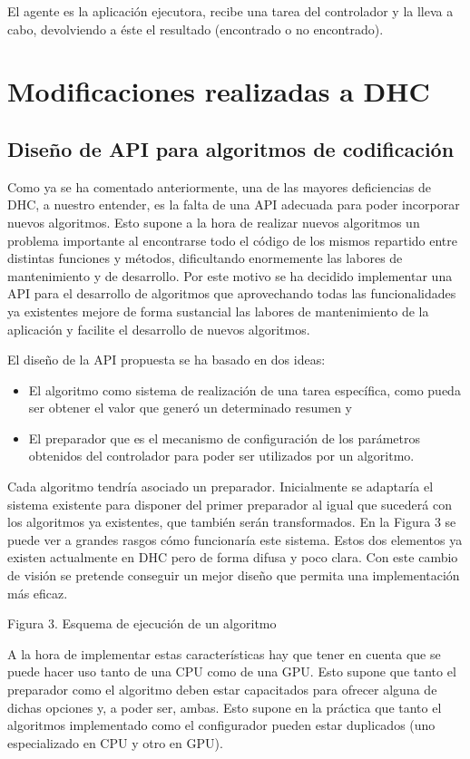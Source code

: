 El agente es la aplicación ejecutora, recibe una tarea del controlador y la lleva a cabo, devolviendo a éste el resultado (encontrado o no encontrado).

\section{Modificaciones realizadas a DHC}

\subsection{Diseño de API para algoritmos de codificación}

Como ya se ha comentado anteriormente, una de las mayores deficiencias de DHC, a nuestro entender, es la falta de una API adecuada para poder incorporar nuevos algoritmos. Esto supone a la hora de realizar nuevos algoritmos un problema importante al encontrarse todo el código de los mismos repartido entre distintas funciones y métodos, dificultando enormemente las labores de mantenimiento y de desarrollo. Por este motivo se ha decidido implementar una API para el desarrollo de algoritmos que aprovechando todas las funcionalidades ya existentes mejore de forma sustancial las labores de mantenimiento de la aplicación y facilite el desarrollo de nuevos algoritmos.

El diseño de la API propuesta se ha basado en dos ideas:
\begin{itemize}
	\item El algoritmo como sistema de realización de una tarea específica, como pueda ser obtener el valor que generó un determinado resumen y
	\item El preparador que es el mecanismo de configuración de los parámetros obtenidos del controlador para poder ser utilizados por un algoritmo.
\end{itemize}

Cada algoritmo tendría asociado un preparador. Inicialmente se adaptaría el sistema existente para disponer del primer preparador al igual que sucederá con los algoritmos ya existentes, que también serán transformados. En la Figura 3 se puede ver a grandes rasgos cómo funcionaría este sistema.
Estos dos elementos ya existen actualmente en DHC pero de forma difusa y poco clara. Con este cambio de visión se pretende conseguir un mejor diseño que permita una implementación más eficaz.
 
Figura 3. Esquema de ejecución de un algoritmo

A la hora de implementar estas características hay que tener en cuenta que se puede hacer uso tanto de una CPU como de una GPU. Esto supone que tanto el preparador como el algoritmo deben estar capacitados para ofrecer alguna de dichas opciones y, a poder ser, ambas. Esto supone en la práctica que tanto el algoritmos implementado como el configurador pueden estar duplicados (uno especializado en CPU y otro en GPU).

